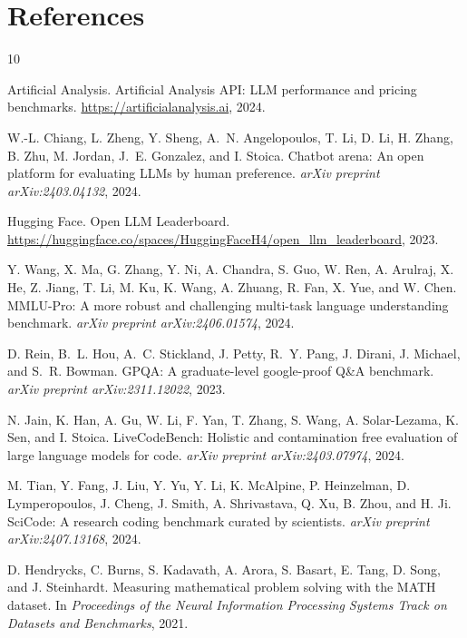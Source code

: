 \documentclass{article}
\begin{document}
\section*{References}

\begin{thebibliography}{10}

Artificial Analysis.
\newblock Artificial Analysis API: LLM performance and pricing benchmarks.
\newblock \url{https://artificialanalysis.ai}, 2024.

W.-L. Chiang, L. Zheng, Y. Sheng, A.~N. Angelopoulos, T. Li, D. Li,
H. Zhang, B. Zhu, M. Jordan, J.~E. Gonzalez, and I. Stoica.
\newblock Chatbot arena: An open platform for evaluating LLMs by human
preference.
\newblock \textit{arXiv preprint arXiv:2403.04132}, 2024.

Hugging Face.
\newblock Open LLM Leaderboard.
\newblock \url{https://huggingface.co/spaces/HuggingFaceH4/open_llm_leaderboard},
2023.

Y. Wang, X. Ma, G. Zhang, Y. Ni, A. Chandra, S. Guo, W. Ren,
A. Arulraj, X. He, Z. Jiang, T. Li, M. Ku, K. Wang, A. Zhuang,
R. Fan, X. Yue, and W. Chen.
\newblock MMLU-Pro: A more robust and challenging multi-task language
understanding benchmark.
\newblock \textit{arXiv preprint arXiv:2406.01574}, 2024.

D. Rein, B.~L. Hou, A.~C. Stickland, J. Petty, R.~Y. Pang,
J. Dirani, J. Michael, and S.~R. Bowman.
\newblock GPQA: A graduate-level google-proof Q\&A benchmark.
\newblock \textit{arXiv preprint arXiv:2311.12022}, 2023.

N. Jain, K. Han, A. Gu, W. Li, F. Yan, T. Zhang, S. Wang, A. Solar-Lezama,
K. Sen, and I. Stoica.
\newblock LiveCodeBench: Holistic and contamination free evaluation of large
language models for code.
\newblock \textit{arXiv preprint arXiv:2403.07974}, 2024.

M. Tian, Y. Fang, J. Liu, Y. Yu, Y. Li, K. McAlpine, P. Heinzelman,
D. Lymperopoulos, J. Cheng, J. Smith, A. Shrivastava, Q. Xu, B. Zhou,
and H. Ji.
\newblock SciCode: A research coding benchmark curated by scientists.
\newblock \textit{arXiv preprint arXiv:2407.13168}, 2024.

D. Hendrycks, C. Burns, S. Kadavath, A. Arora, S. Basart, E. Tang,
D. Song, and J. Steinhardt.
\newblock Measuring mathematical problem solving with the MATH dataset.
\newblock In \textit{Proceedings of the Neural Information Processing Systems
Track on Datasets and Benchmarks}, 2021.


\end{thebibliography}
\end{document}
